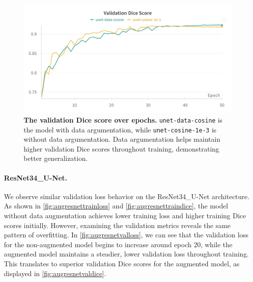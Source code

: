 \documentclass[twocolumn,a4paper]{article}
\begin{document}
\begin{figure}[H]
\centering
\includegraphics[width=0.95\linewidth]{figs/aug_unet_val_dice}
\caption{\textbf{The validation Dice score over epochs.} \texttt{unet-data-cosine} is the model with data argumentation, while \texttt{unet-cosine-1e-3} is without data argumentation. Data argumentation helps maintain higher validation Dice scores throughout training, demonstrating better generalization.}
\label{fig:augunetvaldice}
\end{figure}


\paragraph{ResNet34\_U-Net.} We observe similar validation loss behavior on the ResNet34\_U-Net architecture. As shown in \autoref{fig:augresnettrainloss} and \autoref{fig:augresnettraindice}, the model without data augmentation achieves lower training loss and higher training Dice scores initially. However, examining the validation metrics reveals the same pattern of overfitting. In \autoref{fig:augresnetvalloss}, we can see that the validation loss for the non-augmented model begins to increase around epoch 20, while the augmented model maintains a steadier, lower validation loss throughout training. This translates to superior validation Dice scores for the augmented model, as displayed in \autoref{fig:augresnetvaldice}.
\end{document}

